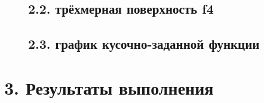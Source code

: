 \documentclass[12pt]{article}
\begin{document}
\begin{figure}[!h]
  \subsection*{2.2. трёхмерная поверхность f4}
 \end{figure}
 
 
\begin{figure}[!h]
 \subsection*{2.3. график кусочно-заданной функции} 
\end{figure}

\section*{3. Результаты выполнения}
 
\end{document}
